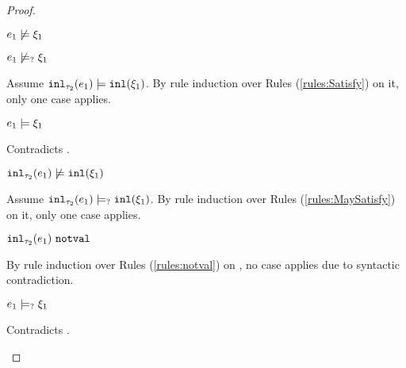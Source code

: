 \begin{proof}
\begin{byCases}
\begin{byCases}
\begin{byCases}
        \item[\cnotsatisfyormay{e_1}{\xi_1}]
            \begin{pfsteps*}
            \item $e_1 \not\models \xi_1$  
            \item $e_1 \not\models_{?} \xi_1$  
            \end{pfsteps*}
            Assume $\mathtt{inl}_{\tau_2}({e_1}) \models \mathtt{inl}(\xi_1)$. By rule induction over Rules (\ref{rules:Satisfy}) on it, only one case applies.
            \begin{byCases}
            \item[\text{(\ref{rule:CSInl})}]
                \begin{pfsteps*}
                \item $e_1 \models \xi_1$
                \end{pfsteps*}
                Contradicts .
            \end{byCases}
            \begin{pfsteps*}
            \item $\mathtt{inl}_{\tau_2}({e_1}) \not\models \mathtt{inl}(\xi_1)$  
            \end{pfsteps*}
            Assume $\mathtt{inl}_{\tau_2}({e_1}) \models_{?} \mathtt{inl}(\xi_1)$. By rule induction over Rules (\ref{rules:MaySatisfy}) on it, only one case applies.
            \begin{byCases}
            \item[\text{(\ref{rule:CMSNotVal})}]
                \begin{pfsteps*}
                \item $\mathtt{inl}_{\tau_2}({e_1}) ~\mathtt{notval}$  
                \end{pfsteps*}
                By rule induction over Rules (\ref{rules:notval}) on , no case applies due to syntactic contradiction.
            \item[\text{(\ref{rule:CMSInl})}]
                \begin{pfsteps*}
                \item $e_1 \models_{?} \xi_1$
                \end{pfsteps*}
                Contradicts .

\end{byCases}
\end{byCases}
\end{byCases}
\end{byCases}
\end{proof}
